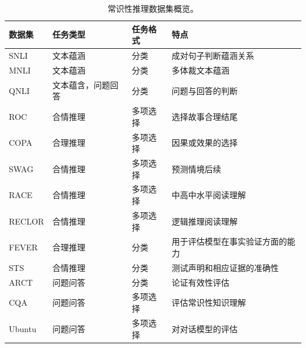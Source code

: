 \begin{table}[th!]
  \centering
  \scriptsize
  \begin{tabular}{
  >{\centering\arraybackslash}p{}|
  >{\centering\arraybackslash}p{}|
  >{\centering\arraybackslash}p{}|
  p{}}
      \toprule
      \textbf{数据集} & \textbf{任务类型} & \textbf{任务格式} & \textbf{特点} \\ 
      \midrule
      SNLI & 文本蕴涵 & 分类 & 成对句子判断蕴涵关系 \\ 
      \midrule
      MNLI & 文本蕴涵 & 分类 & 多体裁文本蕴涵 \\ 
      \midrule
      QNLI & 文本蕴含，问题回答 & 分类 & 问题与回答的判断 \\ 
      \midrule
      ROC & 合情推理 & 多项选择 & 选择故事合理结尾 \\ 
      \midrule
      COPA & 合理推理 & 多项选择 & 因果或效果的选择 \\ 
      \midrule
      SWAG & 合情推理 & 多项选择 & 预测情境后续 \\ 
      \midrule
      RACE & 合情推理 & 多项选择 & 中高中水平阅读理解 \\ 
      \midrule
      RECLOR & 合情推理 & 多项选择 & 逻辑推理阅读理解 \\ 
      \midrule
      FEVER & 合理推理 & 分类 &用于评估模型在事实验证方面的能力 \\ 
      \midrule
      STS & 合情推理 & 分类 &  测试声明和相应证据的准确性\\ 
      \midrule
      ARCT & 问题问答 & 分类 & 论证有效性评估 \\ 
      \midrule
      CQA & 问题问答 & 多项选择 & 评估常识性知识理解 \\ 
      \midrule
      Ubuntu & 问题问答 & 多项选择 & 对对话模型的评估 \\
      \bottomrule
  \end{tabular}
  \caption{常识性推理数据集概览。}
  \label{tab1:datasets}
\end{table}


